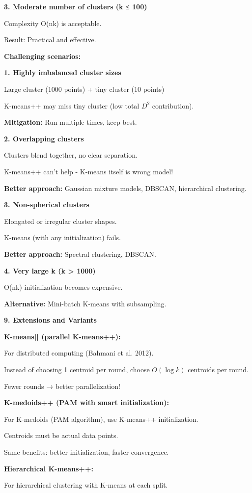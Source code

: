 \documentclass[12pt]{article}
\begin{document}
\begin{explanation}
\textbf{3. Moderate number of clusters (k ≤ 100)}

Complexity O(nk) is acceptable.

Result: Practical and effective.

\textbf{Challenging scenarios:}

\textbf{1. Highly imbalanced cluster sizes}

Large cluster (1000 points) + tiny cluster (10 points)

K-means++ may miss tiny cluster (low total $D^2$ contribution).

\textbf{Mitigation:} Run multiple times, keep best.

\textbf{2. Overlapping clusters}

Clusters blend together, no clear separation.

K-means++ can't help - K-means itself is wrong model!

\textbf{Better approach:} Gaussian mixture models, DBSCAN, hierarchical clustering.

\textbf{3. Non-spherical clusters}

Elongated or irregular cluster shapes.

K-means (with any initialization) fails.

\textbf{Better approach:} Spectral clustering, DBSCAN.

\textbf{4. Very large k (k > 1000)}

O(nk) initialization becomes expensive.

\textbf{Alternative:} Mini-batch K-means with subsampling.

\textbf{9. Extensions and Variants}

\textbf{K-means|| (parallel K-means++):}

For distributed computing (Bahmani et al. 2012).

Instead of choosing 1 centroid per round, choose $O(\log k)$ centroids per round.

Fewer rounds → better parallelization!

\textbf{K-medoids++ (PAM with smart initialization):}

For K-medoids (PAM algorithm), use K-means++ initialization.

Centroids must be actual data points.

Same benefits: better initialization, faster convergence.

\textbf{Hierarchical K-means++:}

For hierarchical clustering with K-means at each split.


\end{explanation}
\end{document}
